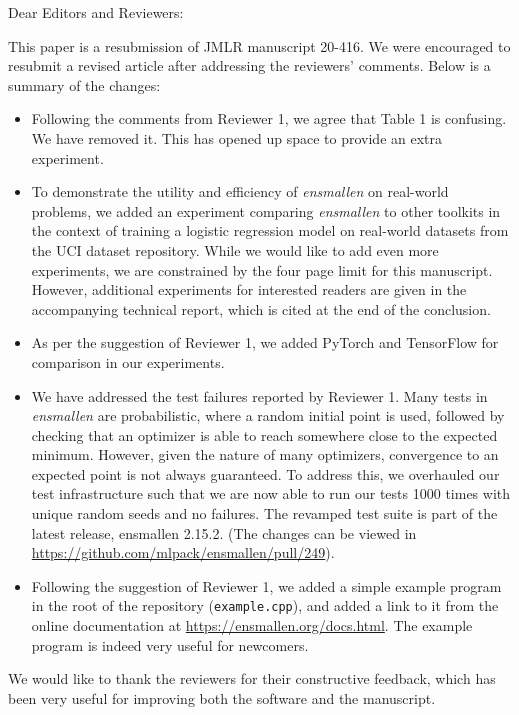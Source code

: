 \documentclass[twoside,11pt]{article}
\begin{document}
\noindent Dear Editors and Reviewers: \\

\medskip

\noindent This paper is a resubmission of JMLR manuscript 20-416.  We were
encouraged to resubmit a revised article after addressing the reviewers' comments.
Below is a summary of the changes:

\begin{itemize}
  \item Following the comments from Reviewer 1, we agree that Table 1 is
confusing. We have removed it.  This has opened up space to provide an extra experiment.

  \item To demonstrate the utility and efficiency of {\it ensmallen} on real-world
problems, we added an experiment comparing {\it ensmallen} to other toolkits in the context of training 
a logistic regression model on real-world datasets from the UCI dataset
repository.  While we would like to add even more experiments,
we are constrained by the four page limit for this manuscript.
However, additional experiments for interested readers are given
in the accompanying technical report, which is cited at the end of the conclusion.

  \item As per the suggestion of Reviewer 1, we added PyTorch and TensorFlow
  for comparison in our experiments.

  \item We have addressed the test failures reported by Reviewer 1.
Many tests in {\it ensmallen} are probabilistic, where a random initial point is used,
followed by checking that an optimizer is able to reach somewhere
close to the expected minimum.  However, given the nature of many optimizers,
convergence to an expected point is not always guaranteed.
To address this, we overhauled our test infrastructure such that we are now able
to run our tests 1000 times with unique random seeds and no failures.
The revamped test suite is part of the latest release, ensmallen 2.15.2.
(The changes can be viewed in \url{https://github.com/mlpack/ensmallen/pull/249}).  

  \item Following the suggestion of Reviewer 1, we added a simple example program
in the root of the repository ({\tt example.cpp}), and added a link to it from the
online documentation at \url{https://ensmallen.org/docs.html}.
The example program is indeed very useful for newcomers.
\end{itemize}

\noindent We would like to thank the reviewers for their constructive feedback,
which has been very useful for improving both the software and the manuscript.
\end{document}
